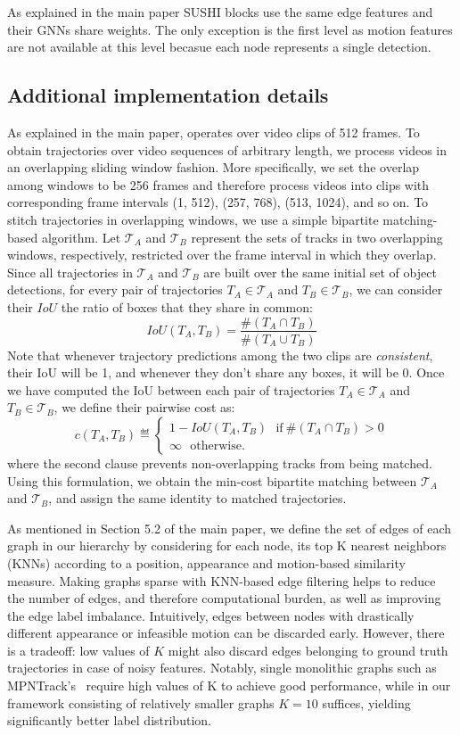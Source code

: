 \documentclass[10pt,twocolumn,letterpaper]{article}
\begin{document}
{{As explained in the main paper SUSHI blocks use the same edge features and their GNNs share weights. The only exception is the first level as motion features are not available at this level becasue each node represents a single detection. 

\subsection{Additional implementation details}
 As explained in the main paper, \modelname operates over video clips of 512 frames. To obtain trajectories over video sequences of arbitrary length, we process videos in an overlapping sliding window fashion. More specifically, we set the overlap among windows to be 256 frames and therefore process videos into clips with corresponding frame intervals (1, 512), (257, 768), (513, 1024), and so on. To stitch trajectories in overlapping windows, we use a simple bipartite matching-based algorithm. Let $\mathcal{T}_A$ and  $\mathcal{T}_B$ represent the sets of tracks in two overlapping windows, respectively, restricted over the frame interval in which they overlap. Since all trajectories in $\mathcal{T}_A$ and $\mathcal{T}_B$ are built over the same initial set of object detections, for every pair of trajectories $T_A \in \mathcal{T}_A$ and $T_B \in \mathcal{T}_B$, we can consider their $IoU$ \ie the ratio of boxes that they share in common:
$$IoU(T_A, T_B) = \frac{ \#(T_A \cap T_B)}{\#(T_A \cup T_B)}$$
Note that whenever trajectory predictions among the two clips are \textit{consistent}, their IoU will be 1, and whenever they don't share any boxes, it will be 0. Once we have computed the IoU between each pair of trajectories  $T_A \in \mathcal{T}_A$ and $T_B \in \mathcal{T}_B$, we define their pairwise cost as:
$$
c(T_A, T_B)\eqdef \begin{cases}
1 - IoU(T_A, T_B)  \  \ \ \text{if} \  \#(T_A \cap T_B) > 0 \\  \infty  \ \  \ \text{otherwise}.
\end{cases}
$$
where the second clause prevents non-overlapping tracks from being matched. Using this formulation, we obtain the min-cost bipartite matching between $\mathcal{T}_A$ and $\mathcal{T}_B$, and assign the same identity to matched trajectories.

 As mentioned in Section 5.2 of the main paper, we define the set of edges of each graph in our hierarchy by considering for each node, its top K nearest neighbors (KNNs) according to a position, appearance and motion-based similarity measure. Making graphs sparse with KNN-based edge filtering helps to reduce the number of edges, and therefore computational burden, as well as improving the edge label imbalance. Intuitively, edges between nodes with drastically different appearance or infeasible motion can be discarded early. However, there is a tradeoff: low values of $K$ might also discard edges belonging to ground truth trajectories in case of noisy features. Notably, single monolithic graphs such as MPNTrack's~\cite{mpntrack} require high values of K to achieve good performance, while in our framework consisting of relatively smaller graphs $K = 10$ suffices, yielding significantly better label distribution. 

}}
\end{document}
